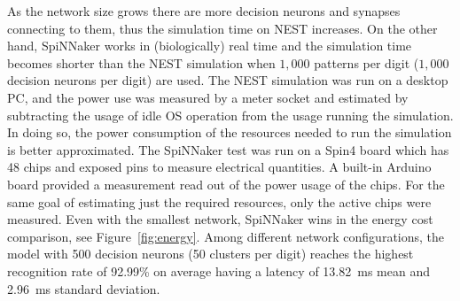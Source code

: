 As the network size grows there are more decision neurons and synapses connecting to them, thus the simulation time on NEST increases.
On the other hand, SpiNNaker works in (biologically) real time and the simulation time becomes shorter than the NEST simulation when $1,000$ patterns per digit ($1,000$ decision neurons per digit) are used.
The NEST simulation was run on a desktop PC, and the power use was measured by a meter socket and estimated by subtracting the usage of idle OS operation from the usage running the simulation.
In doing so, the power consumption of the resources needed to run the simulation is better approximated.
The SpiNNaker test was run on a Spin4 board which has 48 chips and exposed pins to measure electrical quantities.
A built-in Arduino board provided a measurement read out of the power usage of the chips.
For the same goal of estimating just the required resources, only the active chips were measured.
Even with the smallest network, SpiNNaker wins in the energy cost comparison, see Figure~\ref{fig:energy}.
Among different network configurations, the model with 500 decision neurons (50 clusters per digit) reaches the highest recognition rate of 92.99\% on average having a latency of 13.82~ms mean and 2.96~ms standard deviation.
